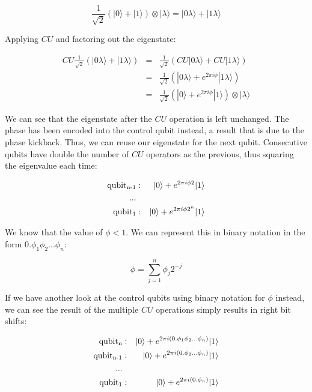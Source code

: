 \documentclass[twocolumn,showpacs,preprintnumbers,amsmath,amssymb]{revtex4}
\begin{document}
		$$ \frac{1}{\sqrt{2}}(|0\rangle + |1\rangle) \otimes |\lambda\rangle = |0 \lambda \rangle + |1 \lambda\rangle$$
		
		Applying $CU$ and factoring out the eigenstate:
		
		\begin{eqnarray*}
		 CU \frac{1}{\sqrt{2}}(|0 \lambda \rangle + |1 \lambda\rangle) &=&  \frac{1}{\sqrt{2}}(CU|0 \lambda \rangle + CU|1 \lambda\rangle )\\
		 &=& \frac{1}{\sqrt{2}}(|0 \lambda \rangle + e^{2\pi i \phi}|1 \lambda\rangle)\\
		 &=&\frac{1}{\sqrt{2}}( |0 \rangle + e^{2\pi i \phi}|1 \rangle)\otimes |\lambda\rangle
		\end{eqnarray*}
		
		We can see that the eigenstate after the $CU$ operation is left unchanged. The phase has been encoded into the control qubit instead, a result that is due to the phase kickback. Thus, we can reuse our eigenstate for the next qubit. Consecutive qubits have double the number of $CU$ operators as the previous, thus squaring the eigenvalue each time:
		
		\begin{eqnarray*}
		\text{qubit\textsubscript{n-1}} &:&   |0 \rangle + e^{2\pi i \phi 2}|1 \rangle \\
		...\\
		\text{qubit\textsubscript{1}} &:&   |0 \rangle + e^{2\pi i \phi 2^n}|1 \rangle
	    \end{eqnarray*}
		
		We know that the value of $\phi < 1$. We can represent this in binary notation in the form $0.\phi_1\phi_2...\phi_n$:
		
		$$\phi = \sum_{j=1}^n \phi_j 2^{-j}$$
		
		If we have another look at the control qubits using binary notation for $\phi$ instead, we can see the result of the multiple $CU$ operations simply results in right bit shifts:
		
		
		\begin{eqnarray*}
			\text{qubit\textsubscript{n}} &:&   |0 \rangle +e^{2\pi i (0.\phi_1\phi_2...\phi_n)}|1 \rangle  \\
			\text{qubit\textsubscript{n-1}} &:&   |0 \rangle + e^{2\pi i (0.\phi_2...\phi_n)}|1 \rangle \\
			...\\
			\text{qubit\textsubscript{1}} &:&   |0 \rangle + e^{2\pi i (0.\phi_n)}|1 \rangle
		\end{eqnarray*}
	
\end{document}

